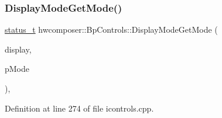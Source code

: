 \subsubsection{\texorpdfstring{Display\+Mode\+Get\+Mode()}{DisplayModeGetMode()}}
{\footnotesize\ttfamily \mbox{\hyperlink{hwcserviceapi_8h_a3806fb2027d9a316d8ca8d9b8b8eb96f}{status\+\_\+t}} hwcomposer\+::\+Bp\+Controls\+::\+Display\+Mode\+Get\+Mode (\begin{DoxyParamCaption}\item[{uint32\+\_\+t}]{display,  }\item[{\mbox{\hyperlink{hwcserviceapi_8h_a6e13f5285374b86aab82ec0c0ba62d7a}{Hwcs\+Display\+Mode\+Info}} $\ast$}]{p\+Mode }\end{DoxyParamCaption})\hspace{0.3cm}{\ttfamily [inline]}, {\ttfamily [override]}}



Definition at line 274 of file icontrols.\+cpp.


